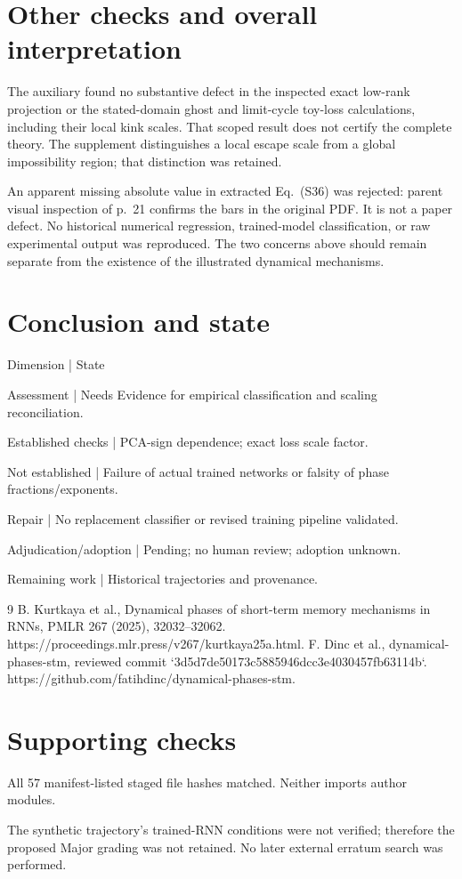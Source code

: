 \documentclass[10pt]{article}
\begin{document}
\section*{Other checks and overall interpretation}
The auxiliary found no substantive defect in the inspected exact low-rank projection or the stated-domain ghost and limit-cycle toy-loss calculations, including their local kink scales. That scoped result does not certify the complete theory. The supplement distinguishes a local escape scale from a global impossibility region; that distinction was retained.\par
An apparent missing absolute value in extracted Eq. (S36) was rejected: parent visual inspection of p. 21 confirms the bars in the original PDF. It is not a paper defect. No historical numerical regression, trained-model classification, or raw experimental output was reproduced. The two concerns above should remain separate from the existence of the illustrated dynamical mechanisms.\par
\section*{Conclusion and state}
Dimension | State\par
Assessment | Needs Evidence for empirical classification and scaling reconciliation.\par
Established checks | PCA-sign dependence; exact loss scale factor.\par
Not established | Failure of actual trained networks or falsity of phase fractions/exponents.\par
Repair | No replacement classifier or revised training pipeline validated.\par
Adjudication/adoption | Pending; no human review; adoption unknown.\par
Remaining work | Historical trajectories and provenance.\par
9 B. Kurtkaya et al., Dynamical phases of short-term memory mechanisms in RNNs, PMLR 267 (2025), 32032–32062. https://proceedings.mlr.press/v267/kurtkaya25a.html. F. Dinc et al., dynamical-phases-stm, reviewed commit `3d5d7de50173c5885946dcc3e4030457fb63114b`. https://github.com/fatihdinc/dynamical-phases-stm.\par
\section*{Supporting checks}
All 57 manifest-listed staged file hashes matched. Neither imports author modules.\par
The synthetic trajectory's trained-RNN conditions were not verified; therefore the proposed Major grading was not retained. No later external erratum search was performed.\par
\end{document}
